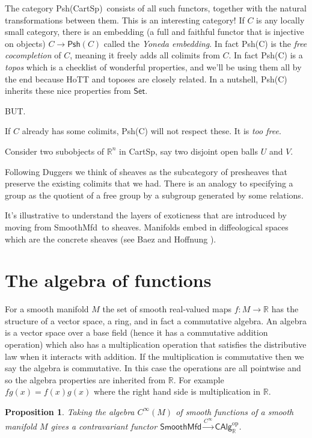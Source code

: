 \documentclass[12pt]{article}
\newcommand{\rr}{\ensuremath{\mathbb{R}}}
\newcommand{\cinfty}{\ensuremath{C^{\infty}}}
\newcommand{\smfd}{\textsf{SmoothMfd}}
\newcommand{\calg}{\textsf{CAlg}_{\rr}}
\newcommand{\cart}{\textsf{CartSp}}
\newcommand{\psh}[1]{\textsf{Psh}(#1)}
\newcommand{\pshcart}{\psh{\cart}}
\newcommand{\gc}[1]{\marginpar{\bf $\leftarrow$ {#1}}}
\newtheorem{myprop}{Proposition}
\begin{document}
The category \pshcart\ consists of all such functors, together with the natural transformations between them. This is an interesting category! If $C$ is any locally small category, there is an embedding (a full and faithful functor that is injective on objects) $C\to\psh{C}$ called the \emph{Yoneda embedding}. In fact \psh{C} is the \emph{free cocompletion} of $C$, meaning it freely adds all colimits from $C$. In fact \psh{C} is a \emph{topos} which is a checklist of wonderful properties, and we'll be using them all by the end because HoTT and toposes are closely related. In a nutshell, \psh{C} inherits these nice properties from $\mathsf{Set}$.

BUT.

If $C$ already has some colimits, \psh{C} will not respect these. It is \emph{too free}. 

Consider two subobjects of $\rr^n$ in \cart, say two disjoint open balls $U$ and $V$. \gc{complete the example}

Following Duggers we think of sheaves as the subcategory of presheaves that preserve the existing colimits that we had. There is an analogy to specifying a group as the quotient of a free group by a subgroup generated by some relations.

It's illustrative to understand the layers of exoticness that are introduced by moving from \smfd\ to sheaves. Manifolds embed in diffeological spaces which are the concrete sheaves (see Baez and Hoffnung \cite{baez_convenient_2008}).\gc{give these subcategories}

\section{The algebra of functions}\label{sec:algebras}

For a smooth manifold $M$ the set of smooth real-valued maps $f:M\to\rr$ has the structure of a vector space, a ring, and in fact a commutative algebra. An algebra is a vector space over a base field (hence it has a commutative addition operation) which also has a multiplication operation that satisfies the distributive law when it interacts with addition. If the multiplication is commutative then we say the algebra is commutative. In this case the operations are all pointwise and so the algebra properties are inherited from \rr. For example $fg(x)=f(x)g(x)$ where the right hand side is multiplication in \rr.

\begin{myprop}\label{prop:algebrafunctor} Taking the algebra $\cinfty(M)$ of smooth functions of a smooth manifold $M$ gives a contravariant functor $\smfd\xrightarrow[]{\cinfty}\calg^{\mathrm{op}}$.
\end{myprop}
\end{document}
